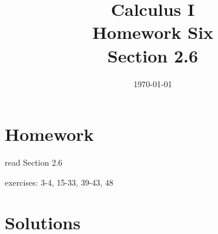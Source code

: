 \documentclass[letterpaper]{exam}
\title{Calculus I \\ Homework Six \\ Section 2.6}
\author{}
\date{\today}
\begin{document}
  \maketitle

  \section{Homework}
    \begin{itemize*}
      \item read Section 2.6
      \item exercises: 3-4, 15-33, 39-43, 48
    \end{itemize*}

  \ifprintanswers

  \section{Solutions}
\end{document}
